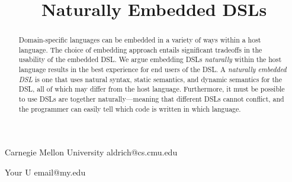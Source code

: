 \documentclass[preprint]{sigplanconf}
\begin{document}
\setlength{\pdfpageheight}{\paperheight}
\setlength{\pdfpagewidth}{\paperwidth}




\title{Naturally Embedded DSLs}

           {Carnegie Mellon University}
           {aldrich@cs.cmu.edu}

           {Your U}
           {email@my.edu}
		   
		   
		   
		   
\maketitle

\begin{abstract}
Domain-specific languages can be embedded in a variety of ways within a
host language.  The choice of embedding approach entails significant
tradeoffs in the usability of the embedded DSL.  We argue embedding DSLs
\textit{naturally} within the host language results in the best
experience for end users of the DSL.  A \textit{naturally embedded DSL}
is one that uses natural syntax, static semantics, and dynamic semantics
for the DSL, all of which may differ from the host language.
Furthermore, it must be possible to use DSLs are together
naturally---meaning that different DSLs cannot conflict, and the
programmer can easily tell which code is written in which language.
\end{abstract}
\end{document}
